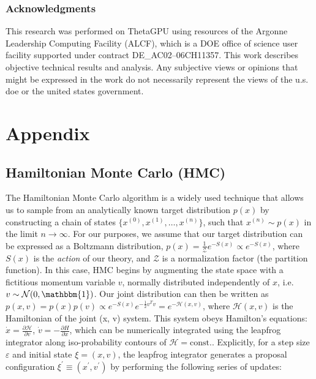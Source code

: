 \documentclass{article} %
\begin{document}
\subsubsection*{Acknowledgments}
This research was performed on ThetaGPU using resources of the Argonne Leadership Computing Facility (ALCF), which is a DOE office of science user
facility supported under contract DE\_AC02--06CH11357.%
%
This work describes objective technical results and analysis.
%
Any subjective views or opinions that might be expressed in the work do not necessarily represent the views of the u.s.
doe or the united states government.




\appendix
\section{Appendix}
%
\subsection{\label{subsec:HMC}Hamiltonian Monte Carlo (HMC)}
%
The Hamiltonian Monte Carlo algorithm is a widely used technique that allows us to sample from an analytically known
target distribution \(p(x)\) by constructing a chain of states \(\{x^{(0)}, x^{(1)}, \ldots, x^{(n)}\}\), such that
\(x^{(n)}\sim p(x)\) in the limit \(n\rightarrow\infty\).
%
For our purposes, we assume that our target distribution can be expressed as a Boltzmann distribution, \(p(x) =
\tfrac{1}{\mathcal{Z}} e^{-S(x)}\propto e^{-S(x)}\), where \(S(x)\) is the \emph{action} of our theory, and
\(\mathcal{Z}\) is a normalization factor (the partition function).
%
In this case, HMC begins by augmenting the state space with a fictitious momentum variable \(v\), normally
distributed independently of \(x\), i.e.\ \(v\sim\mathcal{N}(0, \mathbbm{1})\).
%
Our joint distribution can then be written as \(%
   p(x, v) = p(x) p(v) \propto e^{-S(x)} e^{-\frac{1}{2}v^{T}v} = e^{-\mathcal{H}(x, v)}
\), where \(\mathcal{H}(x, v)\) is the Hamiltonian of the joint (x, v) system.
%
This system obeys Hamilton's equations: %
\(\dot{x} = \frac{\partial\mathcal{H}}{\partial v}\), \(\dot{v} = -\frac{\partial H}{\partial x}\), which can be 
numerically integrated using the leapfrog integrator along iso-probability contours of \(\mathcal{H} = \text{const.}\).
%
Explicitly, for a step size \(\varepsilon\) and initial state \(\xi = (x, v)\), the leapfrog integrator generates a
proposal configuration \(\xi^{\prime} \equiv (x^{\prime}, v^{\prime})\) by performing the following series of updates: 
%
\end{document}
